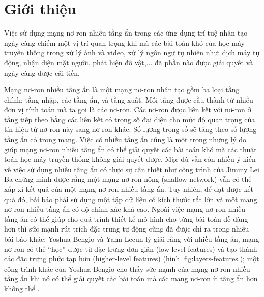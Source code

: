 \chapter{Giới thiệu}
\label{Chapter1}

Việc sử dụng mạng nơ-ron nhiều tầng ẩn trong các ứng dụng trí tuệ nhân tạo ngày càng chiếm một vị trí quan trọng khi mà các bài toán khó của học máy truyền thống trong xử lý ảnh và video, xử lý ngôn ngữ tự nhiên như: dịch máy tự động, nhận diện mặt người, phát hiện đồ vật,... đã phần nào được giải quyết và ngày càng được cải tiến.

Mạng nơ-ron nhiều tầng ẩn là một mạng nơ-ron nhân tạo gồm ba loại tầng chính: tầng nhập, các tầng ẩn, và tầng xuất. Mỗi tầng được cầu thành từ nhiều đơn vị tính toán mà ta gọi là các nơ-ron. Các nơ-ron được liên kết với nơ-ron ở tầng tiếp theo bằng các liên kết có trọng số đại diện cho mức độ quan trọng của tín hiệu từ nơ-ron này sang nơ-ron khác. Số lượng trọng số sẽ tăng theo số lượng tầng ẩn có trong mạng. Việc có nhiều tầng ẩn cũng là một trong những lý do giúp mạng nơ-ron nhiều tầng ẩn có thể giải quyết các bài toán khó mà các thuật toán học máy truyền thống không giải quyết được. Mặc dù vẫn còn nhiều ý kiến về việc sử dụng nhiều tầng ẩn có thực sự cần thiết như công trình của Jimmy Lei Ba\cite{ba2013dodeepnets} chứng minh được rằng một mạng nơ-ron nông (shallow network) vẫn có thể xấp xỉ kết quả của một mạng nơ-ron nhiều tầng ẩn. Tuy nhiên, để đạt được kết quả đó, bài báo phải sử dụng một tập dữ liệu có kích thước rất lớn và một mạng nơ-ron nhiều tầng ẩn có độ chính xác khá cao. Ngoài việc mạng nơ-ron nhiều tầng ẩn có thể giúp cho quá trình thiết kế mô hình cho từng bài toán dễ dàng hơn\cite{nielsen2015neural} thì sức mạnh rút trích đặc trưng tự động cũng đã được chỉ ra trong nhiều bài báo khác: Yoshua Bengio và Yann Lecun lý giải rằng với nhiều tầng ẩn, mạng nơ-ron có thể ``học'' được từ đặc trưng đơn giản (low-level features) và tạo thành các đặc trưng phức tạp hơn (higher-level features)\cite{bengio2007scaling} (hình \ref{fig:layers-features}); một công trình khác của Yoshua Bengio cho thấy sức mạnh của mạng nơ-ron nhiều tầng ẩn khi nó có thể giải quyết các bài toán mà các mạng nơ-ron ít tầng ẩn hơn không thể \cite{bengio2009learning}.

